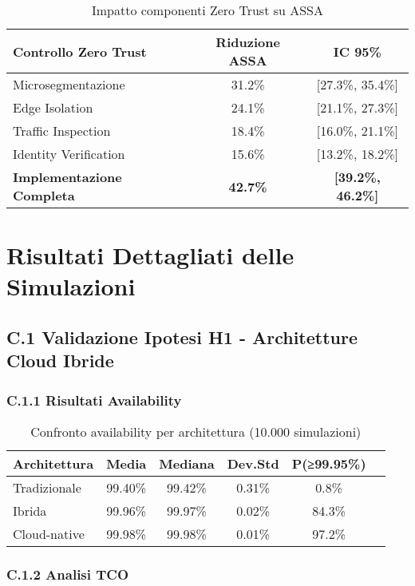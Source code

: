 \begin{table}[htbp]
\centering
\begin{tabular}{lcc}
\toprule
\textbf{Controllo Zero Trust} & \textbf{Riduzione ASSA} & \textbf{IC 95\%} \\
\midrule
Microsegmentazione & 31.2\% & [27.3\%, 35.4\%] \\
Edge Isolation & 24.1\% & [21.1\%, 27.3\%] \\
Traffic Inspection & 18.4\% & [16.0\%, 21.1\%] \\
Identity Verification & 15.6\% & [13.2\%, 18.2\%] \\
\textbf{Implementazione Completa} & \textbf{42.7\%} & \textbf{[39.2\%, 46.2\%]} \\
\bottomrule
\end{tabular}
\caption{Impatto componenti Zero Trust su ASSA}
\end{table}

\chapter{Risultati Dettagliati delle Simulazioni}

\section{C.1 Validazione Ipotesi H1 - Architetture Cloud Ibride}

\subsection{C.1.1 Risultati Availability}

\begin{table}[htbp]
\centering
\begin{tabular}{lccccc}
\toprule
\textbf{Architettura} & \textbf{Media} & \textbf{Mediana} & \textbf{Dev.Std} & \textbf{P(≥99.95\%)} \\
\midrule
Tradizionale & 99.40\% & 99.42\% & 0.31\% & 0.8\% \\
Ibrida & 99.96\% & 99.97\% & 0.02\% & 84.3\% \\
Cloud-native & 99.98\% & 99.98\% & 0.01\% & 97.2\% \\
\bottomrule
\end{tabular}
\caption{Confronto availability per architettura (10.000 simulazioni)}
\end{table}

\subsection{C.1.2 Analisi TCO}

